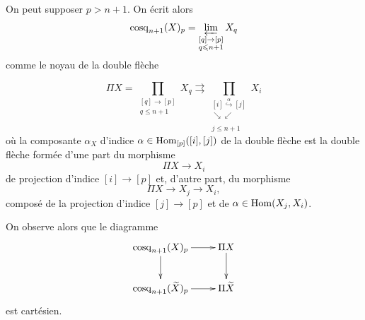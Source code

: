 \documentclass[10pt]{../fichiers-configuration-latex/smfart}
\begin{document}



On peut supposer $p>n+1$. On écrit alors
$$\operatorname{cosq}_{n+1}(X)_p=\varprojlim_{\substack{[q]\rightarrow[p]\\ q\leqslant n+1}}X_q$$
comme le noyau de la double flèche

$$\Pi X=\prod_{\substack{[q]\rightarrow[p]\\ q\leq n+1}}X_q\rightrightarrows
\prod_{\substack{[i]\stackrel{\alpha}{\hookrightarrow}[j]\\
\searrow\swarrow\\
[p]
\\j\leq n+1}}X_i$$ où la
composante $\alpha_X$ d'indice $\alpha\in\operatorname{Hom}_{[p]}([i],[j])$ de la
double flèche est la double flèche formée d'une part du
morphisme $$\Pi X\rightarrow X_i$$ de projection d'indice $[i]\rightarrow[p]$ et,
d'autre part, du morphisme
$$\Pi X\rightarrow X_j\rightarrow X_i,$$ composé de la
projection d'indice $[j]\rightarrow[p]$ et de $\alpha\in\operatorname{Hom}(X_j,X_i)$.

On observe alors que le diagramme
$$\xymatrix{\cosq_{n+1}(X)_p\ar[r]\ar[d]&\Pi X\ar[d]\\
\cosq_{n+1}({\tilde X})_p\ar[r]&\Pi {\tilde X}}$$ est cartésien.
\end{document}
